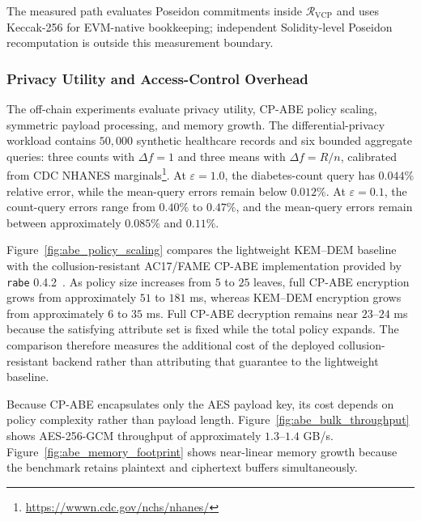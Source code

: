 \documentclass[10pt,journal,compsoc]{IEEEtran}
\begin{document}
The measured path evaluates Poseidon commitments inside $\mathcal{R}_{\mathrm{VCP}}$ and uses Keccak-256 for EVM-native bookkeeping; independent Solidity-level Poseidon recomputation is outside this measurement boundary.

\subsubsection{Privacy Utility and Access-Control Overhead}

The off-chain experiments evaluate privacy utility, CP-ABE policy scaling, symmetric payload processing, and memory growth. The differential-privacy workload contains $50{,}000$ synthetic healthcare records and six bounded aggregate queries: three counts with $\Delta f=1$ and three means with $\Delta f=R/n$, calibrated from CDC NHANES marginals\footnote{\url{https://wwwn.cdc.gov/nchs/nhanes/}}. At $\varepsilon=1.0$, the diabetes-count query has $0.044\%$ relative error, while the mean-query errors remain below $0.012\%$. At $\varepsilon=0.1$, the count-query errors range from $0.40\%$ to $0.47\%$, and the mean-query errors remain between approximately $0.085\%$ and $0.11\%$.

Figure~\ref{fig:abe_policy_scaling} compares the lightweight KEM--DEM baseline with the collusion-resistant AC17/FAME CP-ABE implementation provided by \texttt{rabe} 0.4.2~\cite{agrawal2017fame}. As policy size increases from $5$ to $25$ leaves, full CP-ABE encryption grows from approximately $51$ to $181$ ms, whereas KEM--DEM encryption grows from approximately $6$ to $35$ ms. Full CP-ABE decryption remains near $23$--$24$ ms because the satisfying attribute set is fixed while the total policy expands. The comparison therefore measures the additional cost of the deployed collusion-resistant backend rather than attributing that guarantee to the lightweight baseline.

Because CP-ABE encapsulates only the AES payload key, its cost depends on policy complexity rather than payload length. Figure~\ref{fig:abe_bulk_throughput} shows AES-256-GCM throughput of approximately $1.3$--$1.4$ GB/s. Figure~\ref{fig:abe_memory_footprint} shows near-linear memory growth because the benchmark retains plaintext and ciphertext buffers simultaneously.
\end{document}
